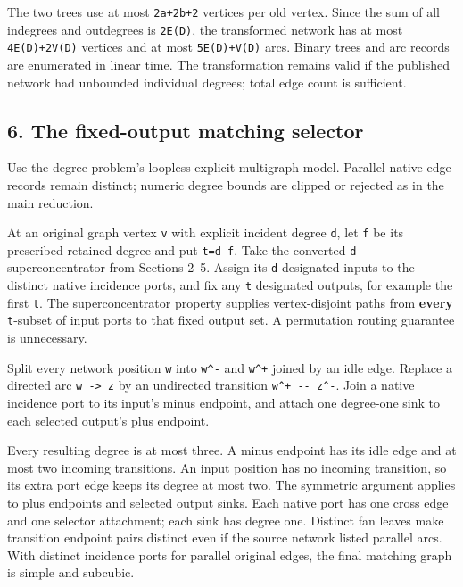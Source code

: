 The two trees use at most \texttt{2a+2b+2} vertices per old vertex. Since the sum of all indegrees and outdegrees is \texttt{2\textbar{}E(D)\textbar{}}, the transformed network has at most \texttt{4\textbar{}E(D)\textbar{}+2\textbar{}V(D)\textbar{}} vertices and at most \texttt{5\textbar{}E(D)\textbar{}+\textbar{}V(D)\textbar{}} arcs. Binary trees and arc records are enumerated in linear time. The transformation remains valid if the published network had unbounded individual degrees; total edge count is sufficient.

\hypertarget{af-a1dc8f9b11-the-fixed-output-matching-selector}{%
\subsection{6. The fixed-output matching selector}\label{af-a1dc8f9b11-the-fixed-output-matching-selector}}

Use the degree problem's loopless explicit multigraph model. Parallel native edge records remain distinct; numeric degree bounds are clipped or rejected as in the main reduction.

At an original graph vertex \texttt{v} with explicit incident degree \texttt{d}, let \texttt{f} be its prescribed retained degree and put \texttt{t=d-f}. Take the converted \texttt{d}-superconcentrator from Sections 2--5. Assign its \texttt{d} designated inputs to the distinct native incidence ports, and fix any \texttt{t} designated outputs, for example the first \texttt{t}. The superconcentrator property supplies vertex-disjoint paths from \textbf{every} \texttt{t}-subset of input ports to that fixed output set. A permutation routing guarantee is unnecessary.

Split every network position \texttt{w} into \texttt{w\^{}-} and \texttt{w\^{}+} joined by an idle edge. Replace a directed arc \texttt{w\ -\textgreater{}\ z} by an undirected transition \texttt{w\^{}+\ -\/-\ z\^{}-}. Join a native incidence port to its input's minus endpoint, and attach one degree-one sink to each selected output's plus endpoint.

Every resulting degree is at most three. A minus endpoint has its idle edge and at most two incoming transitions. An input position has no incoming transition, so its extra port edge keeps its degree at most two. The symmetric argument applies to plus endpoints and selected output sinks. Each native port has one cross edge and one selector attachment; each sink has degree one. Distinct fan leaves make transition endpoint pairs distinct even if the source network listed parallel arcs. With distinct incidence ports for parallel original edges, the final matching graph is simple and subcubic.

